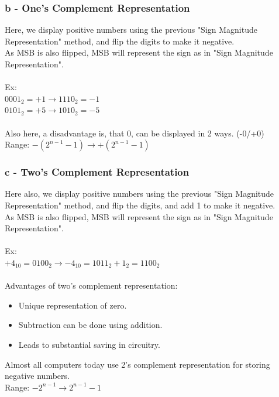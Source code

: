 \documentclass{article}
\begin{document}
\subsubsection*{b - One's Complement Representation}
Here, we display positive numbers using the previous "Sign Magnitude Representation" method, and flip the digits to make it negative.\\
As MSB is also flipped, MSB will represent the sign as in "Sign Magnitude Representation".\\
\\
Ex:\\
$0001_2 = +1 \rightarrow 1110_2 = -1$\\
$0101_2 = +5 \rightarrow 1010_2 = -5$\\
\\
Also here, a disadvantage is, that 0, can be displayed in 2 ways. (-0/+0)\\
Range: $-(2^{n-1} - 1) \rightarrow +(2^{n-1} - 1)$
\subsubsection*{c - Two's Complement Representation}
Here also, we display positive numbers using the previous "Sign Magnitude Representation" method, and flip the digits, and add 1 to make it negative.\\
As MSB is also flipped, MSB will represent the sign as in "Sign Magnitude Representation".\\
\\
Ex:\\
$+4_{10} = 0100_2 \rightarrow -4_{10} = 1011_2 + 1_2 = 1100_2 $\\
\\
Advantages of two's complement representation:
\begin{itemize}
  \item Unique representation of zero.
  \item Subtraction can be done using addition.
  \item Leads to substantial saving in circuitry.
\end{itemize}
Almost all computers today use 2’s complement representation for storing negative numbers.\\
Range: $-2^{n-1} \rightarrow 2^{n-1} - 1$
\end{document}
